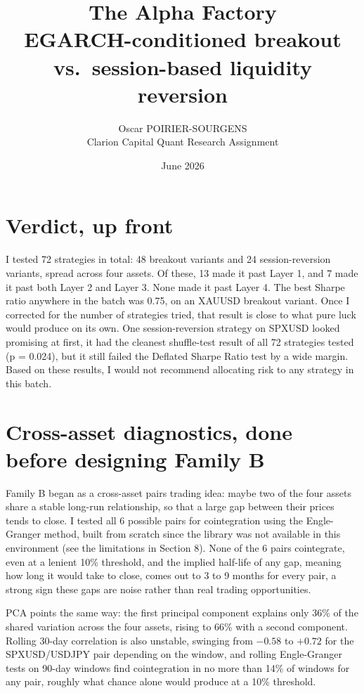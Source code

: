 \documentclass[11pt]{article}
\title{\vspace{-1.8cm}\textbf{\Large The Alpha Factory}\\[2pt]\large EGARCH-conditioned breakout vs.\ session-based liquidity reversion}
\author{Oscar POIRIER-SOURGENS\\\small Clarion Capital Quant Research Assignment}
\date{June 2026}
\newcommand{\code}[1]{\texttt{\detokenize{#1}}}
\begin{document}
\maketitle
\vspace{-1.0cm}

\section*{Verdict, up front}
I tested 72 strategies in total: 48 breakout variants and 24 session-reversion variants, spread across four
assets. Of these, 13 made it past Layer 1, and 7 made it past both Layer 2 and Layer 3. None made it past Layer 4.
The best Sharpe ratio anywhere in the batch was 0.75, on an XAUUSD breakout variant. Once I corrected for the
number of strategies tried, that result is close to what pure luck would produce on its own. One session-reversion
strategy on SPXUSD looked promising at first, it had the cleanest shuffle-test result of all 72 strategies tested
(p = 0.024), but it still failed the Deflated Sharpe Ratio test by a wide margin. Based on these results, I would
not recommend allocating risk to any strategy in this batch.

\section{Cross-asset diagnostics, done before designing Family B}
Family B began as a cross-asset pairs trading idea: maybe two of the four assets share a stable long-run
relationship, so that a large gap between their prices tends to close. I tested all 6 possible pairs for
cointegration using the Engle-Granger method, built from scratch since the \code{statsmodels} library was not
available in this environment (see the limitations in Section 8). None of the 6 pairs cointegrate, even at a
lenient 10\% threshold, and the implied half-life of any gap, meaning how long it would take to close, comes out to
3 to 9 months for every pair, a strong sign these gaps are noise rather than real trading opportunities.

PCA points the same way: the first principal component explains only 36\% of the shared variation across the four
assets, rising to 66\% with a second component. Rolling 30-day correlation is also unstable, swinging from $-0.58$
to $+0.72$ for the SPXUSD/USDJPY pair depending on the window, and rolling Engle-Granger tests on 90-day windows
find cointegration in no more than 14\% of windows for any pair, roughly what chance alone would produce at a 10\%
threshold.
\end{document}
